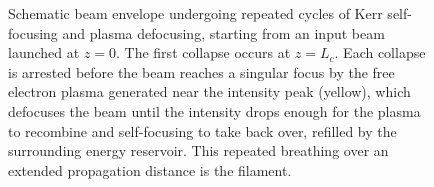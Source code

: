 \begin{figure}[h!]
{%
    }
    \caption{Schematic beam envelope undergoing repeated cycles of Kerr self-focusing and plasma defocusing, starting from an input beam launched at $z=0$. The first collapse occurs at $z=L_c$. Each collapse is arrested before the beam reaches a singular focus by the free electron plasma generated near the intensity peak (yellow), which defocuses the beam until the intensity drops enough for the plasma to recombine and self-focusing to take back over, refilled by the surrounding energy reservoir. This repeated breathing over an extended propagation distance is the filament. }
    \label{fig:filamentation_schematic}
\end{figure}